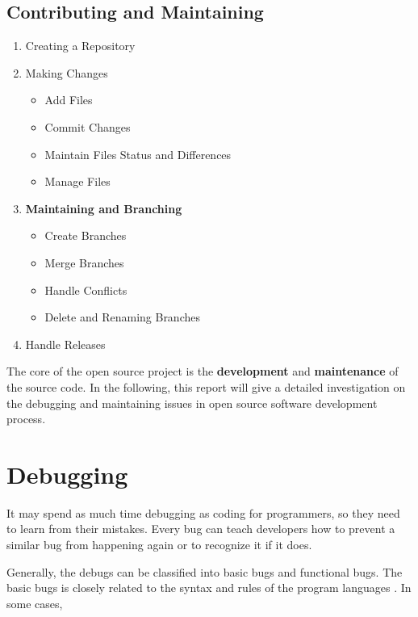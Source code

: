 \documentclass[draftclsnofoot,journal,onecolumn,12pt]{IEEEtran}
\begin{document}
\subsection{Contributing and Maintaining}

\begin{enumerate}
  \item Creating a Repository
  \item Making Changes
  \begin{itemize}
    \item Add Files
    \item Commit Changes
    \item Maintain Files Status and Differences
    \item Manage Files
  \end{itemize}
  \item \textbf{Maintaining and Branching}
  \begin{itemize}
    \item Create Branches
    \item Merge Branches
    \item Handle Conflicts
    \item Delete and Renaming Branches
\end{itemize}
  \item Handle Releases
\end{enumerate}

The core of the open source project is the \textbf{development} and \textbf{maintenance} of the source code. In the following, this report will give a detailed investigation on the debugging and maintaining issues in open source software development process.

\section{Debugging}


It may spend as much time debugging as coding for programmers, so they need to learn from their mistakes. Every bug can teach developers how to prevent a similar bug from happening again or to recognize it if it does.

Generally, the debugs can be classified into basic bugs and functional bugs. The basic bugs is closely related to the syntax and rules of the program languages \cite{kernighan1999practice}. In some cases,
\end{document}
